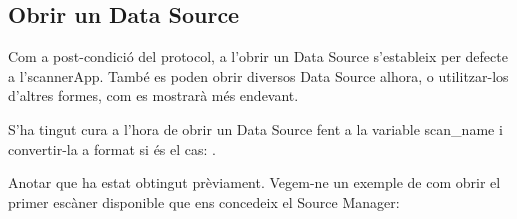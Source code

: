 \documentclass[letterpaper,11pt,catalan]{sphinxmanual}
\begin{document}
\subsection{Obrir un Data Source}
\label{\detokenize{index:obrir-un-data-source}}
Com a post-condició del protocol, a l'obrir un Data Source s'estableix per defecte
a l'scannerApp. També es poden obrir diversos Data Source alhora, o utilitzar-los
d'altres formes, com es mostrarà més endevant.

\begin{sphinxVerbatim}[commandchars=\\\{\}]
  
        
        
\end{sphinxVerbatim}

S'ha tingut cura a l'hora de obrir un Data Source fent  a la variable
scan\_name i convertir-la a format  si és el cas: .

Anotar que  ha estat obtingut prèviament. Vegem-ne un exemple de com
obrir el primer escàner disponible que ens concedeix el Source Manager:

\begin{sphinxVerbatim}[commandchars=\\\{\}]
 
  
  \PYG{p}{[}\PYG{p}{]}
\end{sphinxVerbatim}
\end{document}
